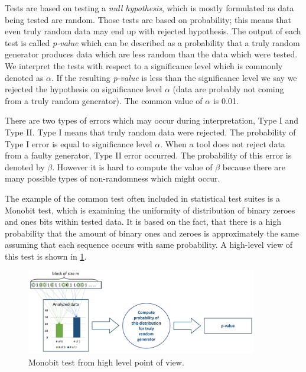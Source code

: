 \documentclass[
    digital,    %
    oneside,    %
    color,
    11pt,
    nocover,
    notable,
    nolof,
    nolot,
    final
]{fithesis3}
\renewcommand\_{\textunderscore\allowbreak}
\begin{document}
Tests are based on testing a \textit{null hypothesis}, which is mostly formulated as data being tested are random. Those tests are based on probability; this means that even truly random data may end up with rejected hypothesis. The output of each test is called \textit{p-value} which can be described as a probability that a truly random generator produces data which are less random than the data which were tested. We interpret the tests with respect to a significance level which is commonly denoted as $\alpha$. If the resulting \textit{p-value} is less than the significance level we say we rejected the hypothesis on significance level $\alpha$ (data are probably not coming from a truly random generator). The common value of $\alpha$ is 0.01. \cite{nist-explanation}

There are two types of errors which may occur during interpretation, Type I and Type II. Type I means that truly random data were rejected. The probability of Type I error is equal to significance level $\alpha$. When a tool does not reject data from a faulty generator, Type II error occurred. The probability of this error is denoted by $\beta$. However it is hard to compute the value of $\beta$ because there are many possible types of non-randomness which might occur. \cite{nist-explanation}

The example of the common test often included in statistical test suites is a Monobit test, which is examining the uniformity of distribution of binary zeroes and ones bits within tested data. It is based on the fact, that there is a high probability that the amount of binary ones and zeroes is approximately the same assuming that each sequence occurs with same probability. A high-level view of this test is shown in \cref{fig:monobit}. 

\begin{figure}[h]
	\centering
	\includegraphics[width=0.9\textwidth]{./images/pictures/monobit-high-level.png}
	\caption{Monobit test from high level point of view.}
	\label{fig:monobit}
\end{figure}
\end{document}
